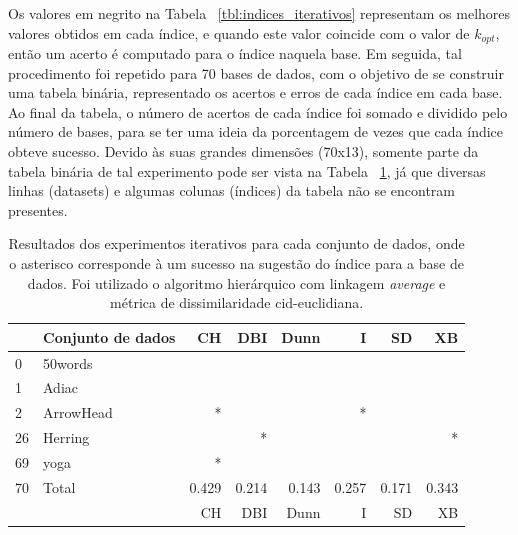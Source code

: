 Os valores em negrito na Tabela ~\ref{tbl:indices_iterativos} representam os melhores valores obtidos em cada índice, e quando este valor coincide com o valor de $k_{opt}$, então um acerto é computado para o índice naquela base. Em seguida, tal procedimento foi repetido para 70 bases de dados, com o objetivo de se construir uma tabela binária, representado os acertos e erros de cada índice em cada base. Ao final da tabela, o número de acertos de cada índice foi somado e dividido pelo número de bases, para se ter uma ideia da porcentagem de vezes que cada índice obteve sucesso. Devido às suas grandes dimensões (70x13), somente parte da tabela binária de tal experimento pode ser vista na Tabela ~\ref{tbl:indices_hits}, já que diversas linhas (datasets) e algumas colunas (índices) da tabela não se encontram presentes.

	\begin{table}[!h]
		\centering
		\caption{Resultados dos experimentos iterativos para cada conjunto de dados, onde o asterisco corresponde à um sucesso na sugestão do índice para a base de dados. Foi utilizado o algoritmo hierárquico com linkagem \emph{average} e métrica de dissimilaridade cid-euclidiana.}  \label{tbl:indices_hits} 
			\begin{tabular}{llrrrrrr}
				\toprule
				{} &                         Conjunto de dados &     CH &    DBI &   Dunn &      I &     SD &     XB \\
				\midrule
				0  &                         50words &    &    &    &    &    &   \\
				1  &                           Adiac &    &    &    &    &    &    \\
				2  &                       ArrowHead &  * &    &    &  * &    &  \\				
				26 &                         Herring &    &  * &    &    &    &  * \\			
				69 &                            yoga &  * &    &    &    &    &    \\
				 \rowcolor{lightgray} 70 &                           Total &  0.429 &  0.214 &  0.143 &  0.257 &  0.171 &  0.343\\
				 {} &                         {}  &     CH &    DBI &   Dunn &      I &     SD &     XB\\
			\bottomrule
		\end{tabular}
	\end{table}
	
